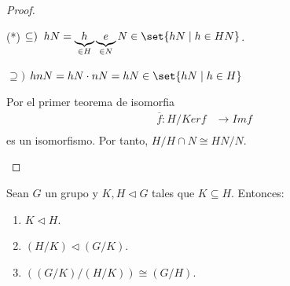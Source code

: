 \begin{proof}
\begin{enumerate}
		      (*) \(\subseteq)\;\; hN = \underbrace{h}_{\in H}\underbrace{e}_{\in N} N \in \set{hN \mid h \in HN}\).
		      
		      \(\supseteq) \) \(hn N = hN \cdot nN = hN \in \set{hN \mid h \in H }\)
		      
		      \vspace{0.2cm}
		      Por el primer teorema de isomorfia
		      \[
			      \begin{aligned}
				      \overline{f} \colon H / Kerf & \longrightarrow Imf \\
			      \end{aligned}
		      \]
		      es un isomorfismo. Por tanto, \(H / H \cap N \cong HN / N  \).
	\end{enumerate}
\end{proof}
\begin{theorem}
	Sean \(G \) un grupo y \(K,H \triangleleft G \) tales que \(K \subseteq H \). Entonces:
	\begin{enumerate}
		\item \(K \triangleleft H \).
		\item \((H/ K ) \triangleleft (G / K)\).
		\item \(((G / K)/(H / K)) \cong (G / H )\).
	\end{enumerate}
\end{theorem}
